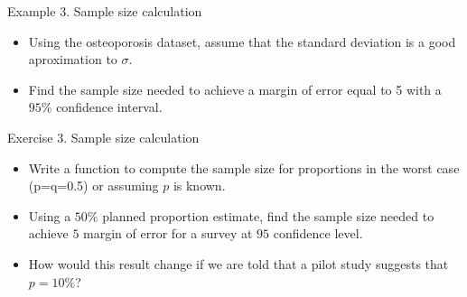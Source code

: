\documentclass[
  ignorenonframetext,
]{beamer}
\begin{document}
\begin{frame}{Example 3. Sample size calculation}
\protect\hypertarget{example-3.-sample-size-calculation}{}
\begin{itemize}
\item
  Using the osteoporosis dataset, assume that the standard deviation is
  a good aproximation to \(\sigma\).
\item
  Find the sample size needed to achieve a margin of error equal to 5
  with a \(95\%\) confidence interval.
\end{itemize}
\end{frame}

\begin{frame}{Exercise 3. Sample size calculation}
\protect\hypertarget{exercise-3.-sample-size-calculation}{}
\begin{itemize}
\item
  Write a function to compute the sample size for proportions in the
  worst case (p=q=0.5) or assuming \(p\) is known.
\item
  Using a \(50\%\) planned proportion estimate, find the sample size
  needed to achieve \(5%
  \) margin of error for a survey at \(95%
  \) confidence level.
\item
  How would this result change if we are told that a pilot study
  suggests that \(p=10\%\)?
\end{itemize}
\end{frame}
\end{document}

